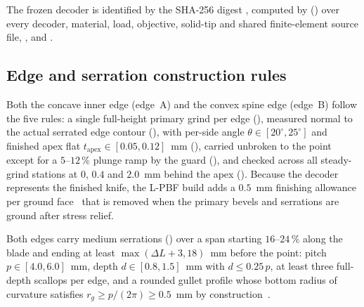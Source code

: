 The frozen decoder is identified by the SHA-256 digest \gDecoder{}, computed by 
() over every decoder, material, load, objective, solid-tip and shared
finite-element source file, , and .

\subsection{Edge and serration construction rules}
Both the concave inner edge (edge~A) and the convex spine edge (edge~B) follow the five  rules: a single
full-height primary grind per edge (), measured normal to the actual serrated edge contour (),
with per-side angle $\theta \in [20^\circ, 25^\circ]$ and finished apex flat $t_\mathrm{apex} \in [0.05, 0.12]$~mm
(), carried unbroken to the point except for a $5$--$12\,\%$ plunge ramp by the guard (), and
checked across all steady-grind stations at $0$, $0.4$ and $2.0$~mm behind the apex (). Because the decoder
represents the finished knife, the L-PBF build adds a $0.5$~mm finishing allowance per ground face~\cite{beretta2017,barricelli2022}
that is removed when the primary bevels and serrations are ground after stress relief.

Both edges carry medium serrations () over a span starting $16$--$24\,\%$ along the blade and ending
at least $\max(\Delta L + 3, 18)$~mm before the point: pitch $p \in [4.0, 6.0]$~mm, depth $d \in [0.8, 1.5]$~mm with
$d \le 0.25\,p$, at least three full-depth scallops per edge, and a rounded gullet profile whose bottom radius of curvature
satisfies $r_g \ge p/(2\pi) \ge 0.5$~mm by construction~\cite{us4823467}.
